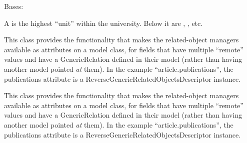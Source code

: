 \documentclass[letterpaper,10pt,english]{sphinxmanual}
\begin{document}

\begin{fulllineitems}
\label{generated/apps.profiles.models:apps.profiles.models.Division}
Bases: {\hyperref[generated/apps.profiles.models:apps.profiles.models.BaseModel]{}}

A  is the highest ``unit'' within the university.  Below it
are  , , etc.


\begin{fulllineitems}
\label{generated/apps.profiles.models:apps.profiles.models.Division.authorities}
This class provides the functionality that makes the related-object
managers available as attributes on a model class, for fields that have
multiple ``remote'' values and have a GenericRelation defined in their model
(rather than having another model pointed \emph{at} them). In the example
``article.publications'', the publications attribute is a
ReverseGenericRelatedObjectsDescriptor instance.

\end{fulllineitems}



\begin{fulllineitems}
\label{generated/apps.profiles.models:apps.profiles.models.Division.unit_permissions}
This class provides the functionality that makes the related-object
managers available as attributes on a model class, for fields that have
multiple ``remote'' values and have a GenericRelation defined in their model
(rather than having another model pointed \emph{at} them). In the example
``article.publications'', the publications attribute is a
ReverseGenericRelatedObjectsDescriptor instance.

\end{fulllineitems}


\end{fulllineitems}


\end{document}
